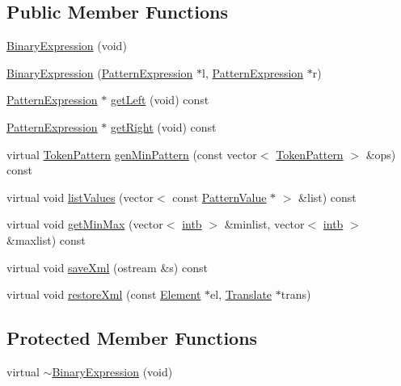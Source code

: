 \subsection*{Public Member Functions}
\begin{DoxyCompactItemize}
\item 
\mbox{\hyperlink{class_binary_expression_a4e926e2b391cc51c985e5a57de85fbca}{Binary\+Expression}} (void)
\item 
\mbox{\hyperlink{class_binary_expression_ac26d83792e22e1e9c3e8b2320e945f2e}{Binary\+Expression}} (\mbox{\hyperlink{class_pattern_expression}{Pattern\+Expression}} $\ast$l, \mbox{\hyperlink{class_pattern_expression}{Pattern\+Expression}} $\ast$r)
\item 
\mbox{\hyperlink{class_pattern_expression}{Pattern\+Expression}} $\ast$ \mbox{\hyperlink{class_binary_expression_abae7e8c5cbaa1158cc82f622fc9d54d4}{get\+Left}} (void) const
\item 
\mbox{\hyperlink{class_pattern_expression}{Pattern\+Expression}} $\ast$ \mbox{\hyperlink{class_binary_expression_a1f9e5f958b015a2959ad0adea1f11efd}{get\+Right}} (void) const
\item 
virtual \mbox{\hyperlink{class_token_pattern}{Token\+Pattern}} \mbox{\hyperlink{class_binary_expression_a840abb5f9741368ab019495a2b4c5dbf}{gen\+Min\+Pattern}} (const vector$<$ \mbox{\hyperlink{class_token_pattern}{Token\+Pattern}} $>$ \&ops) const
\item 
virtual void \mbox{\hyperlink{class_binary_expression_ae1a069bae9f98bcb4a4d4f2324e068c8}{list\+Values}} (vector$<$ const \mbox{\hyperlink{class_pattern_value}{Pattern\+Value}} $\ast$ $>$ \&list) const
\item 
virtual void \mbox{\hyperlink{class_binary_expression_afbce1a4f9e87f25ed8d52792b4d40425}{get\+Min\+Max}} (vector$<$ \mbox{\hyperlink{types_8h_aa925ba3e627c2df89d5b1cfe84fb8572}{intb}} $>$ \&minlist, vector$<$ \mbox{\hyperlink{types_8h_aa925ba3e627c2df89d5b1cfe84fb8572}{intb}} $>$ \&maxlist) const
\item 
virtual void \mbox{\hyperlink{class_binary_expression_a4b9e768a619b713d6c1ff35a618d98ec}{save\+Xml}} (ostream \&s) const
\item 
virtual void \mbox{\hyperlink{class_binary_expression_a05e25a311c4f20e01317a707668cf71c}{restore\+Xml}} (const \mbox{\hyperlink{class_element}{Element}} $\ast$el, \mbox{\hyperlink{class_translate}{Translate}} $\ast$trans)
\end{DoxyCompactItemize}
\subsection*{Protected Member Functions}
\begin{DoxyCompactItemize}
\item 
virtual \mbox{\hyperlink{class_binary_expression_a4a94945aac08d6ad45a1fbe9d0a42cb5}{$\sim$\+Binary\+Expression}} (void)
\end{DoxyCompactItemize}

